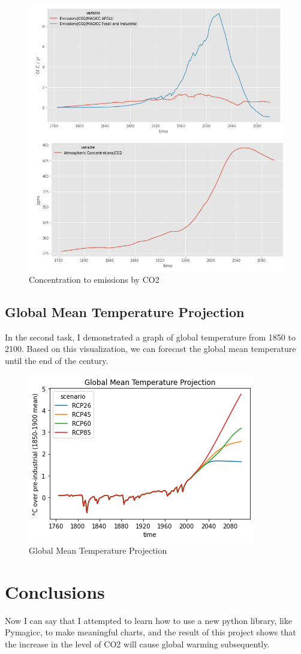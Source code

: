\documentclass[12pt, letterpaper]{article}
\begin{document}
\begin{figure}[hbt!]
\centering
\includegraphics[scale=0.7]{Task1.PNG}
\caption{Concentration to emissions by CO2}
\label{fig:Task1}
\end{figure}

\subsection{Global Mean Temperature Projection}
In the second task, I demonstrated a graph of global temperature from 1850 to 2100. Based on this visualization, we can forecast the global mean temperature until the end of the century.

\begin{figure}[hbt!]
\centering
\includegraphics[scale=0.7]{Task2.PNG}
\caption{Global Mean Temperature Projection}
\label{fig:Task2}
\end{figure}

\section{Conclusions}
Now I can say that I attempted to learn how to use a new python library, like Pymagicc, to make meaningful charts, and the result of this project shows that the increase in the level of CO2 will cause global warming subsequently. 

\printbibliography
\end{document}
